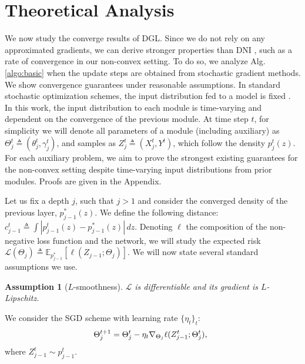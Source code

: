 \documentclass{article}
\newtheorem{assumption}{Assumption}
\begin{document}
\section{Theoretical Analysis}
We now study the converge results of DGL. Since we do not rely on any approximated gradients, we can derive stronger properties than DNI \cite{czarnecki2017}, such as a rate of convergence in our non-convex setting.
To do so, we analyze  Alg. \ref{algo:basic} when the update steps are obtained from stochastic gradient methods. We show convergence guarantees \citep{bottou2018optimization} under reasonable assumptions. In standard stochastic optimization schemes, the input distribution fed to a model is fixed \citep{bottou2018optimization}. In this work, the input distribution to each module is time-varying and dependent on the convergence of the previous module. At time step $t$, for simplicity we will denote all parameters of a module (including auxiliary) as $\Theta_j^t\triangleq(\theta_j^t,\gamma_j^t)$, and samples as $Z_j^t\triangleq (X_j^t,Y^t)$, which follow the density $p_j^t(z)$.  For each auxiliary problem, we aim to prove the strongest existing guarantees \citep{bottou2018optimization,Huo2018} for the  non-convex setting despite time-varying input distributions from prior modules. Proofs %
are given in the Appendix.%


Let us fix a depth $j$, such that $j>1$ and consider the converged density of the previous layer, $p^*_{j-1}(z)$. We define the following distance: $c^t_{j-1}\triangleq \int |p_{j-1}^t(z)-p_{j-1}^*(z)|\,dz$. Denoting $\ell$ the composition of the non-negative loss function and the network, we will study the expected risk $\mathcal{L}(\Theta_{j})\triangleq \mathbb{E}_{p^*_{j-1}}[\ell(Z_{j-1};\Theta_j)]$. We will now state several standard assumptions we use.
\begin{assumption}[$L$-smoothness] $\mathcal{L}$ is differentiable and its gradient is  $L$-Lipschitz.\end{assumption}
We consider the SGD scheme with learning rate $\{\eta_t\}_t$:
\begin{equation}
\hspace{-0.5em}\Theta^{t+1}_{j}=\Theta^t_j-\eta_t \nabla_{\Theta_j} \ell(Z_{j-1}^t;\Theta_j^t),
\end{equation}\vspace{-3pt}
where \(Z^t_{j-1}\sim p_{j-1}^t\).
\end{document}
